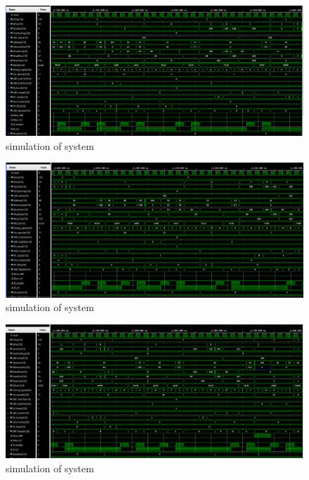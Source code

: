 \documentclass[pdftex,12pt,a4paper]{article}
\begin{document}
\begin{figure}[H]
    \centering
    \includegraphics[width=1\textwidth]{photos/system_result_10.png}	
    \caption{simulation of system}
    \label{implementation}
\end{figure}

\begin{figure}[H]
    \centering
    \includegraphics[width=1\textwidth]{photos/system_result_11.png}	
    \caption{simulation of system}
    \label{implementation}
\end{figure}

\begin{figure}[H]
    \centering
    \includegraphics[width=1\textwidth]{photos/system_result_12.png}	
    \caption{simulation of system}
    \label{implementation}
\end{figure}
\end{document}
